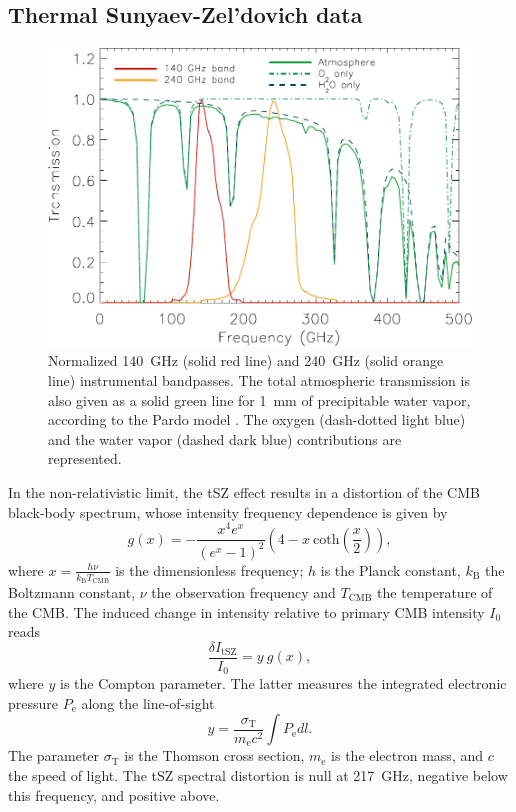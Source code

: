 \subsection{Thermal Sunyaev-Zel'dovich data}
\label{sec:tsz_data}
    	\begin{figure}
	\centering
	\includegraphics[width=\columnwidth]{Figure/bandpass}
	\caption{Normalized 140~GHz (solid red line) and 240~GHz (solid orange line) instrumental bandpasses. The total atmospheric transmission is also given as a solid green line for 1~mm of precipitable water vapor, according to the Pardo model \citep{Pardo}. The oxygen (dash-dotted light blue) and the water vapor (dashed dark blue) contributions are represented.}
        \label{fig:bandpass}
	\end{figure}
	
In the non-relativistic limit, the tSZ effect results in a distortion of the CMB black-body spectrum, whose intensity frequency dependence is given by \citep{Birkinshaw}
\begin{equation}
	g(x) = - \frac{x^4 e^x}{\left(e^x-1\right)^2} \left(4 - x  \ \mathrm{coth}\left(\frac{x}{2}\right) \right),
	\label{eq:sz_f_x}
\end{equation}
where $x = \frac{h \nu}{k_{\mathrm{B}} T_{\mathrm{CMB}}}$ is the dimensionless frequency; $h$ is the Planck constant, $k_{\mathrm{B}}$ the Boltzmann constant, $\nu$ the observation frequency and $T_{\mathrm{CMB}}$ the temperature of the CMB. The induced change in intensity relative to primary CMB intensity $I_0$ reads
\begin{equation}
	\frac{\delta I_{\mathrm{tSZ}}}{I_0} = y \ g(x),
\label{eq:Taniso}
\end{equation}
 where $y$ is the Compton parameter. The latter measures the integrated electronic pressure $P_{\mathrm{e}}$ along the line-of-sight
   \begin{equation}
	y = \frac{\sigma_{\mathrm{T}}}{m_{\mathrm{e}} c^2} \int P_{\mathrm{e}} dl.
	\label{eq:y_compton}
   \end{equation}
The parameter $\sigma_{\mathrm{T}}$ is the Thomson cross section, $m_{\mathrm{e}}$ is the electron mass, and $c$ the speed of light. The tSZ spectral distortion is null at 217~GHz, negative below this frequency, and positive above.

